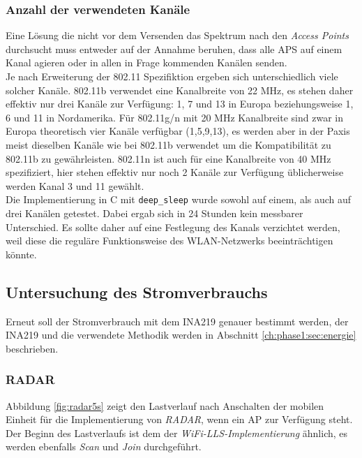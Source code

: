 \subsubsection{Anzahl der verwendeten Kanäle}
Eine Lösung die nicht vor dem Versenden das Spektrum nach den \emph{Access Points} durchsucht muss entweder auf der Annahme beruhen, dass alle APS auf einem Kanal agieren oder in allen in Frage kommenden Kanälen senden.\\
Je nach Erweiterung der 802.11 Spezifiktion ergeben sich unterschiedlich viele solcher Kanäle.
802.11b verwendet eine Kanalbreite von 22 MHz, es stehen daher effektiv nur drei Kanäle zur Verfügung: 1, 7 und 13 in Europa beziehungsweise 1, 6 und 11 in Nordamerika.
Für 802.11g/n mit 20 MHz Kanalbreite sind zwar in Europa theoretisch vier Kanäle verfügbar (1,5,9,13), es werden aber in der Paxis meist dieselben Kanäle wie bei 802.11b verwendet um die Kompatibilität zu 802.11b zu gewährleisten.
802.11n ist auch für eine Kanalbreite von 40 MHz spezifiziert, hier stehen effektiv nur noch 2 Kanäle zur Verfügung üblicherweise werden Kanal 3 und 11 gewählt.\\
Die Implementierung in C mit \texttt{deep\_sleep} wurde sowohl auf einem, als auch auf drei Kanälen getestet.
Dabei ergab sich in 24 Stunden kein messbarer Unterschied.
Es sollte daher auf eine Festlegung des Kanals verzichtet werden, weil diese die reguläre Funktionsweise des WLAN-Netzwerks beeinträchtigen könnte.


\subsection{Untersuchung des Stromverbrauchs}
Erneut soll der Stromverbrauch mit dem INA219 genauer bestimmt werden, der INA219 und die verwendete Methodik werden in Abschnitt \ref{ch:phase1:sec:energie} beschrieben.


\subsubsection{RADAR}
\label{ch:phase2:sec:powerradar}
Abbildung \ref{fig:radar5s} zeigt den Lastverlauf nach Anschalten der mobilen Einheit für die Implementierung von \emph{RADAR}, wenn ein AP zur Verfügung steht. 
Der Beginn des Lastverlaufs ist dem der \emph{WiFi-LLS-Implementierung} ähnlich, es werden ebenfalls \emph{Scan} und \emph{Join} durchgeführt.\\

